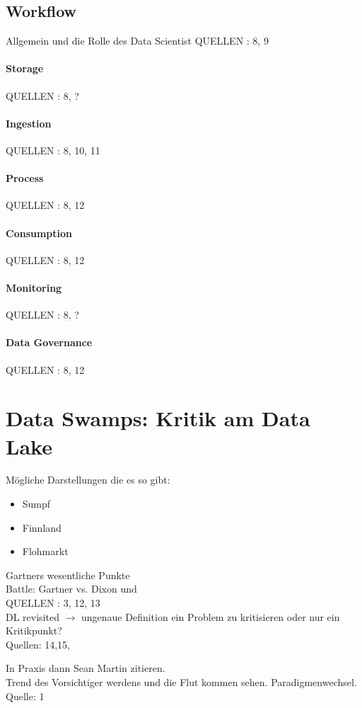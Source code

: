 \documentclass[
10pt, %
a4paper, %
oneside, %
headinclude,footinclude, %
BCOR5mm, %
]{scrartcl}
\begin{document}
\subsection{Workflow}
Allgemein und die Rolle des Data Scientist
QUELLEN : 8, 9
\paragraph{Storage}
QUELLEN : 8, ?
\paragraph{Ingestion}
QUELLEN : 8, 10, 11
\paragraph{Process}
QUELLEN : 8, 12
\paragraph{Consumption}
QUELLEN : 8, 12
\paragraph{Monitoring}
QUELLEN : 8, ?
\paragraph{Data Governance}
QUELLEN : 8, 12


\section{Data Swamps: Kritik am Data Lake}
Mögliche Darstellungen die es so gibt:
\begin{itemize}
	\item Sumpf
	\item Finnland
	\item Flohmarkt
\end{itemize}

Gartners wesentliche Punkte\\

Battle: Gartner vs. Dixon und \\
QUELLEN : 3, 12, 13\\
DL revisited $\rightarrow$ ungenaue Definition ein Problem zu kritisieren oder nur ein Kritikpunkt?\\
Quellen: 14,15,

In Praxis dann Sean Martin zitieren.\\
Trend des Vorsichtiger werdens und die Flut kommen sehen. Paradigmenwechsel.
Quelle: 1
\end{document}

